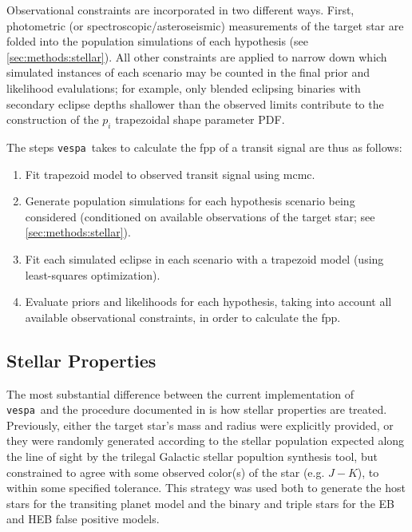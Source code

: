 \documentclass[preprint2]{aastex}
\newcommand{\vespa}{\texttt{vespa}}
\begin{document}
Observational constraints are incorporated in two different ways.
First, photometric (or spectroscopic/asteroseismic) measurements of
the target star are folded into the population simulations of each
hypothesis (see \autoref{sec:methods:stellar}).  All other constraints are
applied to narrow down which simulated instances of each scenario may
be counted in the final prior and likelihood evalulations; for example,
only blended eclipsing binaries with secondary eclipse depths
shallower than the observed limits contribute to the construction of
the $p_i$ trapezoidal shape parameter PDF.

The steps \vespa\ takes to calculate the \ac{fpp} of a transit signal
are thus as follows:
\begin{enumerate}
\item Fit trapezoid model to observed transit signal using \ac{mcmc}.
\item Generate population simulations for each hypothesis scenario
  being considered (conditioned on available observations of the
  target star; see \autoref{sec:methods:stellar}).
\item Fit each simulated eclipse in each scenario with a trapezoid
  model (using least-squares optimization).
\item Evaluate priors and likelihoods for each hypothesis, taking into
  account all available observational constraints, in order to
  calculate the \ac{fpp}.
\end{enumerate}


\subsection{Stellar Properties}
\label{sec:methods:stellar}

The most substantial difference between the current implementation of
\vespa\ and the procedure documented in  is
how stellar properties are treated.  Previously, either the target
star's mass and radius were explicitly provided, or they were randomly
generated according to the stellar population expected along the line
of sight by the \ac{trilegal} Galactic stellar popultion synthesis
tool, but constrained to agree with some observed color(s) of the star
(e.g. $J-K$), to within some specified tolerance.  This strategy was
used both to generate the host stars for the transiting planet model
and the binary and triple stars for the EB and HEB false positive
models.
\end{document}
